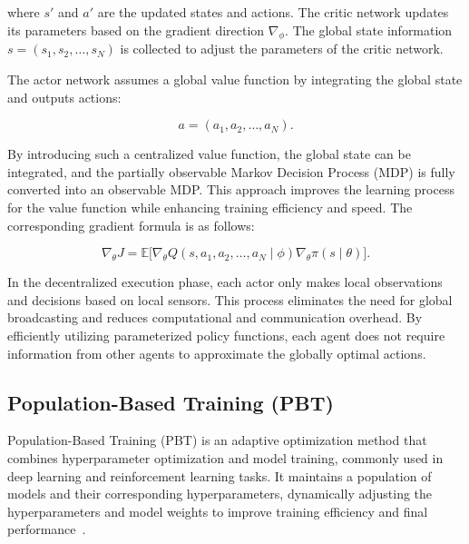 \documentclass[preprint,12pt]{elsarticle}
\begin{document}
where $s'$ and $a'$ are the updated states and actions. The critic network updates its parameters based on the 
gradient direction $\nabla_\phi$. The global state information $s = (s_1, s_2, \ldots, s_N)$ is collected to
 adjust the parameters of the critic network.

The actor network assumes a global value function by integrating the global state and outputs actions:

\begin{equation}
a = (a_1, a_2, \ldots, a_N).
\end{equation}

By introducing such a centralized value function, the global state can be integrated, and the partially 
observable Markov Decision Process (MDP) is fully converted into an observable MDP. This approach improves 
the learning process for the value function while enhancing training efficiency and speed. The corresponding 
gradient formula is as follows:

\begin{equation}
\nabla_\theta J = \mathbb{E}\bigl[\nabla_\theta Q(s, a_1, a_2, \ldots, a_N \mid \phi) \nabla_\theta \pi(s \mid \theta)\bigr].
\end{equation}

In the decentralized execution phase, each actor only makes local observations and decisions 
based on local sensors. This process eliminates the need for global broadcasting and reduces computational 
and communication overhead. By efficiently utilizing parameterized policy functions, each agent does not 
require information from other agents to approximate the globally optimal actions.
\subsection{Population-Based Training (PBT)}

\begin{figure}
    \centering
\end{figure}

Population-Based Training (PBT) is an adaptive optimization method that combines 
hyperparameter optimization and model training, commonly used in deep learning and 
reinforcement learning tasks. It maintains a population of models and their corresponding 
hyperparameters, dynamically adjusting the hyperparameters and model weights to improve 
training efficiency and final performance~\cite{ref23}.
\end{document}
